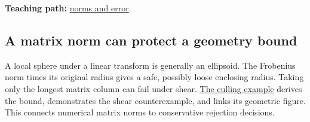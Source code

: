 \textbf{Teaching path:} \href{Continuous\%20Notes/Computing\%20Foundations\%20-\%20From\%20Bits\%20to\%20C++\%20and\%20Systems\%20APIs\#Matrix\%20norms\%20give\%20scale\%20to\%20residuals\%20and\%20error\%20claims}{norms and error}.

\subsection{A matrix norm can protect a geometry bound}\label{a-matrix-norm-can-protect-a-geometry-bound}

A local sphere under a linear transform is generally an ellipsoid. The Frobenius norm times its original radius gives a safe, possibly loose enclosing radius. Taking only the longest matrix column can fail under shear. \href{Continuous\%20Notes/University\%20-\%20Worlds,\%20Images\%20and\%20Inference\%20-\%20Graphics,\%20Vision\%20and\%20Photography\#A\%20line\%20corridor\%20can\%20be\%20a\%20cheap\%20prefilter\%20for\%20shadow-caster\%20work}{The culling example} derives the bound, demonstrates the shear counterexample, and links its geometric figure. This connects numerical matrix norms to conservative rejection decisions.
